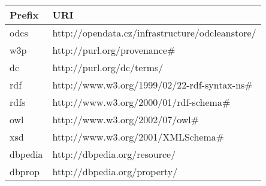 \begin{table}[h!]
\centering
\begin{tabular}{|l|l|}
	\hline
	\ttfamily
	\textrm{\textbf{Prefix}} & \textrm{\textbf{URI}} \\
	\hline\hline
	odcs & http://opendata.cz/infrastructure/odcleanstore/ \\
	\hline
	w3p & http://purl.org/provenance\# \\
	\hline
	dc & http://purl.org/dc/terms/ \\
	\hline
	rdf & http://www.w3.org/1999/02/22-rdf-syntax-ns\# \\
	\hline
	rdfs & http://www.w3.org/2000/01/rdf-schema\# \\
	\hline
	owl & http://www.w3.org/2002/07/owl\# \\
	\hline
	xsd & http://www.w3.org/2001/XMLSchema\# \\
	\hline
	dbpedia & http://dbpedia.org/resource/ \\
	\hline
	dbprop & http://dbpedia.org/property/ \\
	\hline
\end{tabular}
\end{table} 


